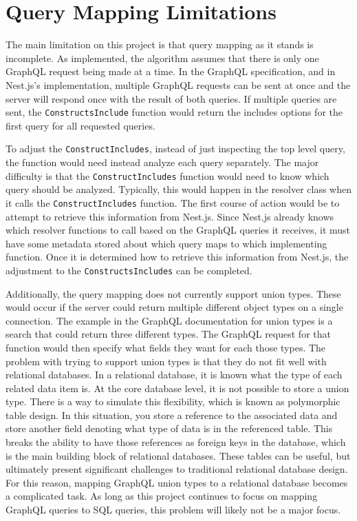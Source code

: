 \section{Query Mapping Limitations}
The main limitation on this project is that query mapping as it stands is incomplete. As implemented, the algorithm assumes that there is only one GraphQL request being made at a time.  In the GraphQL specification, and in Nest.js's implementation, multiple GraphQL requests can be sent at once and the server will respond once with the result of both queries.  If multiple queries are sent, the \verb!ConstructsInclude! function would return the includes options for the first query for all requested queries.

To adjust the \verb!ConstructIncludes!, instead of just inspecting the top level query, the function would need instead analyze each query separately.  The major difficulty is that the \verb!ConstructIncludes! function would need to know which query should be analyzed. Typically, this would happen in the resolver class when it calls the \verb!ConstructIncludes! function. The first course of action would be to attempt to retrieve this information from Nest.js.  Since Nest.js already knows which resolver functions to call based on the GraphQL queries it receives, it must have some metadata stored about which query maps to which implementing function.  Once it is determined how to retrieve this information from Nest.js, the adjustment to the \verb!ConstructsIncludes! can be completed.

Additionally, the query mapping does not currently support union types.  These would occur if the server could return multiple different object types on a single connection.  The example in the GraphQL documentation for union types is a search that could return three different types.  The GraphQL request for that function would then specify what fields they want for each those types.  The problem with trying to support union types is that they do not fit well with relational databases.  In a relational database, it is known what the type of each related data item is.  At the core database level, it is not possible to store a union type.  There is a way to simulate this flexibility, which is known as polymorphic table design.  In this situation, you store a reference to the associated data and store another field denoting what type of data is in the referenced table.  This breaks the ability to have those references as foreign keys in the database, which is the main building block of relational databases. These tables can be useful, but ultimately present significant challenges to traditional relational database design.  For this reason, mapping GraphQL union types to a relational database becomes a complicated task.  As long as this project continues to focus on mapping GraphQL queries to SQL queries, this problem will likely not be a major focus.

